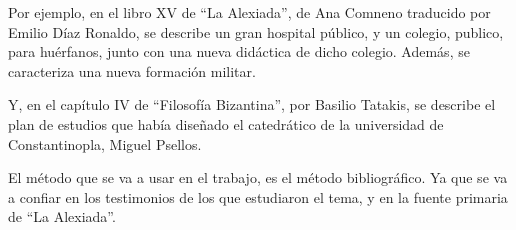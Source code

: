 Por ejemplo, en el libro XV de “La Alexiada”, 
de Ana Comneno traducido por Emilio Díaz
Ronaldo, se describe un gran hospital 
público, y un colegio, publico, para huérfanos, junto con una nueva 
didáctica de dicho colegio. Además, se caracteriza una nueva formación militar.

Y, en el capítulo IV de “Filosofía Bizantina”, 
por Basilio Tatakis, se describe el plan de 
estudios que había diseñado el catedrático de la universidad de 
Constantinopla, Miguel Psellos.

El método que se va a usar en el trabajo, es el método bibliográfico. 
Ya que se va a confiar en los testimonios de los que estudiaron el 
tema, y en la fuente primaria de “La Alexiada”.


